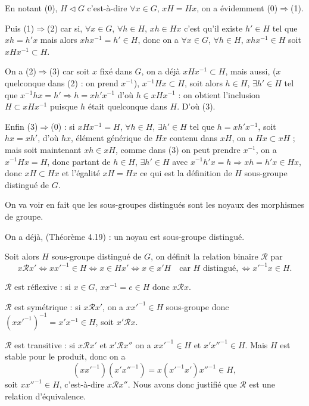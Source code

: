 En notant (0), $H\triangleleft G$ c'est-à-dire $\forall x\in G$, $xH=Hx$, on a évidemment (0)$\Rightarrow$(1).

Puis (1)$\Rightarrow$(2) car si, $\forall x\in G$, $\forall h\in H$, $xh\in Hx$ c'est qu'il existe $h'\in H$ tel que $xh=h'x$ mais alors $xhx^{-1}=h'\in H$, donc on a $\forall x\in G$, $\forall h\in H$, $xhx^{-1}\in H$ soit $xHx^{-1}\subset H$.

On a (2)$\Rightarrow$(3) car soit $x$ fixé dans $G$, on a déjà $xHx^{-1}\subset H$, mais aussi, ($x$ quelconque dans (2) : on prend $x^{-1}$), $x^{-1}Hx\subset H$, soit alors $h\in H$, $\exists h'\in H$ tel que $x^{-1}hx=h'\Rightarrow h=xh'x^{-1}$ d'où $h\in xHx^{-1}$ : on obtient l'inclusion $H\subset xHx^{-1}$ puisque $h$ était quelconque dans $H$. D'où (3).

Enfin (3)$\Rightarrow$(0) : si $xHx^{-1}=H$, $\forall h\in H$, $\exists h'\in H$ tel que $h=xh'x^{-1}$, soit $hx=xh'$, d'où $hx$, élément générique de $Hx$ contenu dans $xH$, on a $Hx\subset xH$ ; mais soit maintenant $xh\in xH$, comme dans (3) on peut prendre $x^{-1}$, on a $x^{-1}Hx=H$, donc partant de $h\in H$, $\exists h'\in H$ avec $x^{-1}h'x=h\Rightarrow xh=h'x\in Hx$, donc $xH\subset Hx$ et l'égalité $xH=Hx$ ce qui est la définition de $H$ sous-groupe distingué de $G$. \bookend

On va voir en fait que les sous-groupes distingués sont les noyaux des morphismes de groupe.

On a déjà, (Théorème 4.19) : un noyau est sous-groupe distingué.

Soit alors $H$ sous-groupe distingué de $G$, on définit la relation binaire $\mathcal R$ par
\[
x\mathcal R x'
\Longleftrightarrow xx'^{-1}\in H
\Longleftrightarrow x\in Hx'
\Longleftrightarrow x\in x'H\quad\text{car $H$ distingué},
\Longleftrightarrow x'^{-1}x\in H.
\]

$\mathcal R$ est réflexive : si $x\in G$, $xx^{-1}=e\in H$ donc $x\mathcal R x$.

$\mathcal R$ est symétrique : si $x\mathcal R x'$, on a $xx'^{-1}\in H$ sous-groupe donc $(xx'^{-1})^{-1}=x'x^{-1}\in H$, soit $x'\mathcal R x$.

$\mathcal R$ est transitive : si $x\mathcal R x'$ et $x'\mathcal R x''$ on a $xx'^{-1}\in H$ et $x'x''^{-1}\in H$. Mais $H$ est stable pour le produit, donc on a
\[
(xx'^{-1})(x'x''^{-1})=x(x'^{-1}x')x''^{-1}\in H,
\]
soit $xx''^{-1}\in H$, c'est-à-dire $x\mathcal R x''$. Nous avons donc justifié que $\mathcal R$ est une relation d'équivalence.

